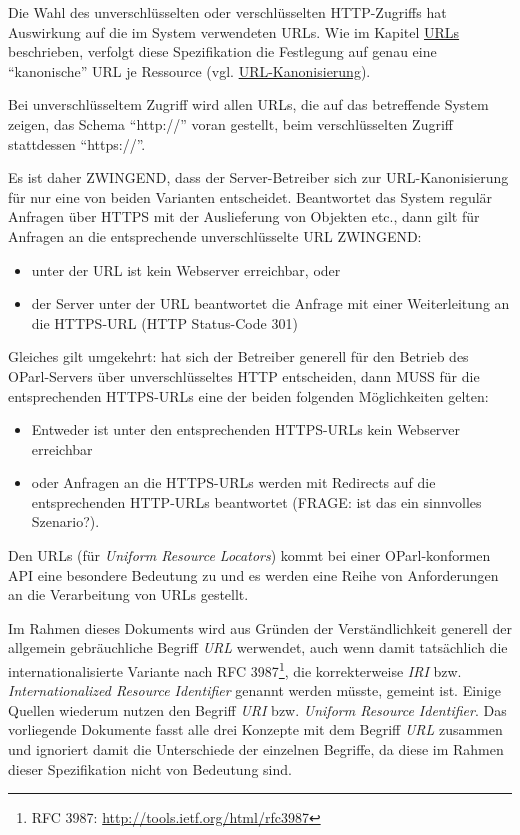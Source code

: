 \documentclass[,a4paper]{article}
\begin{document}
Die Wahl des unverschlüsselten oder verschlüsselten HTTP-Zugriffs hat
Auswirkung auf die im System verwendeten URLs. Wie im Kapitel
\hyperref[urls]{URLs} beschrieben, verfolgt diese Spezifikation die
Festlegung auf genau eine ``kanonische'' URL je Ressource (vgl.
\hyperref[urlux5fkanonisierung]{URL-Kanonisierung}).

Bei unverschlüsseltem Zugriff wird allen URLs, die auf das betreffende
System zeigen, das Schema ``http://'' voran gestellt, beim
verschlüsselten Zugriff stattdessen ``https://''.

Es ist daher ZWINGEND, dass der Server-Betreiber sich zur
URL-Kanonisierung für nur eine von beiden Varianten entscheidet.
Beantwortet das System regulär Anfragen über HTTPS mit der Auslieferung
von Objekten etc., dann gilt für Anfragen an die entsprechende
unverschlüsselte URL ZWINGEND:

\begin{itemize}
\item
  unter der URL ist kein Webserver erreichbar, oder
\item
  der Server unter der URL beantwortet die Anfrage mit einer
  Weiterleitung an die HTTPS-URL (HTTP Status-Code 301)
\end{itemize}

Gleiches gilt umgekehrt: hat sich der Betreiber generell für den Betrieb
des OParl-Servers über unverschlüsseltes HTTP entscheiden, dann MUSS für
die entsprechenden HTTPS-URLs eine der beiden folgenden Möglichkeiten
gelten:

\begin{itemize}
\item
  Entweder ist unter den entsprechenden HTTPS-URLs kein Webserver
  erreichbar
\item
  oder Anfragen an die HTTPS-URLs werden mit Redirects auf die
  entsprechenden HTTP-URLs beantwortet (FRAGE: ist das ein sinnvolles
  Szenario?).
\end{itemize}


Den URLs (für \emph{Uniform Resource Locators}) kommt bei einer
OParl-konformen API eine besondere Bedeutung zu und es werden eine Reihe
von Anforderungen an die Verarbeitung von URLs gestellt.

Im Rahmen dieses Dokuments wird aus Gründen der Verständlichkeit
generell der allgemein gebräuchliche Begriff \emph{URL} werwendet, auch
wenn damit tatsächlich die internationalisierte Variante nach RFC
3987\footnote{RFC 3987: \url{http://tools.ietf.org/html/rfc3987}}, die
korrekterweise \emph{IRI} bzw. \emph{Internationalized Resource
Identifier} genannt werden müsste, gemeint ist. Einige Quellen wiederum
nutzen den Begriff \emph{URI} bzw. \emph{Uniform Resource Identifier}.
Das vorliegende Dokumente fasst alle drei Konzepte mit dem Begriff
\emph{URL} zusammen und ignoriert damit die Unterschiede der einzelnen
Begriffe, da diese im Rahmen dieser Spezifikation nicht von Bedeutung
sind.
\end{document}
